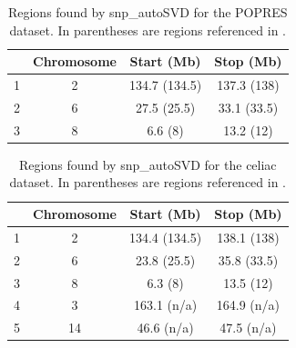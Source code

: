 \documentclass{bioinfo}
\begin{document}
\begin{table}[!tpb]
\centering
\begin{tabular}{lccc}
  \hline
 & Chromosome & Start (Mb) & Stop (Mb) \\ 
  \hline
1 &  2 & 134.7 (134.5) & 137.3 (138) \\ 
  2 &  6 & 27.5 (25.5) & 33.1 (33.5) \\ 
  3 &  8 & 6.6 (8) & 13.2 (12) \\ 
   \hline
\end{tabular}
\caption{Regions found by snp\_autoSVD for the POPRES dataset. In parentheses are regions referenced in \cite[]{Price2008}.}
\label{tab:lrldr-popres}
\end{table}

\begin{table}[!tpb]
\centering
\begin{tabular}{lccc}
  \hline
 & Chromosome & Start (Mb) & Stop (Mb) \\ 
  \hline
1 &  2 & 134.4 (134.5) & 138.1 (138) \\ 
  2 &  6 & 23.8 (25.5) & 35.8 (33.5) \\ 
  3 &  8 & 6.3 (8) & 13.5 (12) \\ 
  4 &  3 & 163.1 (n/a) & 164.9 (n/a) \\ 
  5 & 14 & 46.6 (n/a) & 47.5 (n/a) \\ 
   \hline
\end{tabular}
\caption{Regions found by snp\_autoSVD for the celiac dataset. In parentheses are regions referenced in \cite[]{Price2008}.}
\label{tab:lrldr-celiac}
\end{table}
\end{document}
